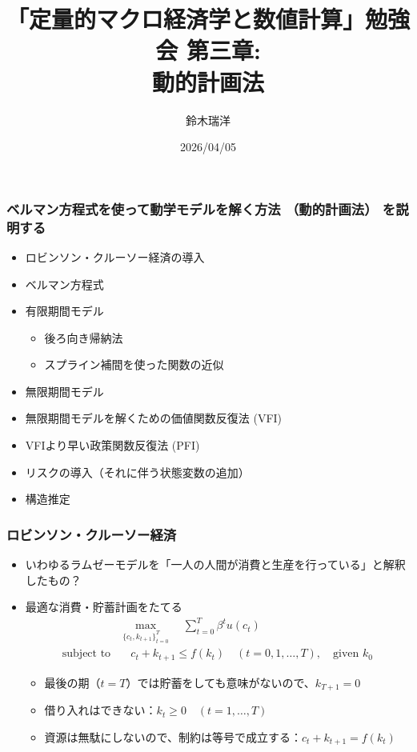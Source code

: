 \documentclass[unicode,9pt]{beamer}%
\title{「定量的マクロ経済学と数値計算」勉強会 第三章: \\ 動的計画法}
\author{鈴木瑞洋}
\date{2026/04/05}
\begin{document}
\begin{frame}
\titlepage
\end{frame}

\begin{frame}\frametitle{ベルマン方程式を使って動学モデルを解く方法 （動的計画法） を説明する}
  \begin{itemize}
      \item ロビンソン・クルーソー経済の導入
      \item ベルマン方程式
      \item 有限期間モデル
        \begin{itemize}
            \item 後ろ向き帰納法
            \item スプライン補間を使った関数の近似
        \end{itemize}
      \item 無限期間モデル
      \item 無限期間モデルを解くための価値関数反復法 (VFI)
      \item VFIより早い政策関数反復法 (PFI)
      \item リスクの導入（それに伴う状態変数の追加）
      \item 構造推定
  \end{itemize}
\end{frame}

\begin{frame}\frametitle{ロビンソン・クルーソー経済}
  \begin{itemize}
      \item いわゆるラムゼーモデルを「一人の人間が消費と生産を行っている」と解釈したもの？
      \item 最適な消費・貯蓄計画をたてる
        \begin{align*}
          &\max_{\{c_t, k_{t+1}\}_{t=0}^T} \quad \sum_{t = 0}^T \beta^t u(c_t) \\
          \text{subject to} &\quad c_t + k_{t + 1} \le f(k_t) \quad (t = 0, 1, \dots, T), \quad \text{given $k_0$}
        \end{align*}
        \begin{itemize}
          \item 最後の期（$t = T$）では貯蓄をしても意味がないので、$k_{T+1}=0$
          \item 借り入れはできない：$k_t \ge 0 \quad (t = 1, \dots, T)$
          \item 資源は無駄にしないので、制約は等号で成立する：$c_t + k_{t + 1} = f(k_t)$
        \end{itemize}
  \end{itemize}
\end{frame}
\end{document}
